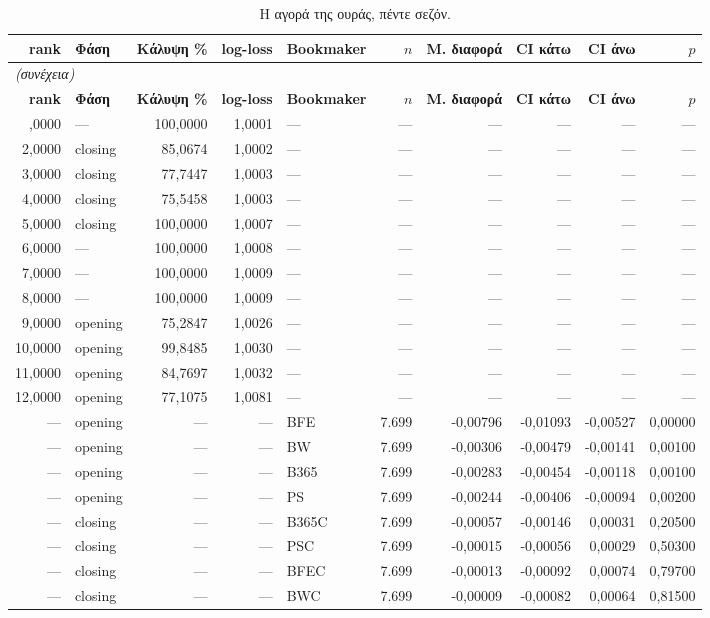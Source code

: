 {\scriptsize
\begin{longtable}{@{}rlrrlrrrrr@{}}
\caption{Η αγορά της ουράς, πέντε σεζόν.}\label{app:rwlive}\\
\toprule \textbf{rank} & \textbf{Φάση} & \textbf{Κάλυψη \%} & \textbf{log-loss} & \textbf{Bookmaker} & \textbf{$n$} & \textbf{Μ. διαφορά} & \textbf{CI κάτω} & \textbf{CI άνω} & \textbf{$p$} \\\midrule\endfirsthead
\multicolumn{10}{l}{\emph{(συνέχεια)}}\\\toprule \textbf{rank} & \textbf{Φάση} & \textbf{Κάλυψη \%} & \textbf{log-loss} & \textbf{Bookmaker} & \textbf{$n$} & \textbf{Μ. διαφορά} & \textbf{CI κάτω} & \textbf{CI άνω} & \textbf{$p$} \\\midrule\endhead
\bottomrule\endfoot
1,0000 & --- & 100,0000 & 1,0001 & --- & --- & --- & --- & --- & --- \\
2,0000 & closing & 85,0674 & 1,0002 & --- & --- & --- & --- & --- & --- \\
3,0000 & closing & 77,7447 & 1,0003 & --- & --- & --- & --- & --- & --- \\
4,0000 & closing & 75,5458 & 1,0003 & --- & --- & --- & --- & --- & --- \\
5,0000 & closing & 100,0000 & 1,0007 & --- & --- & --- & --- & --- & --- \\
6,0000 & --- & 100,0000 & 1,0008 & --- & --- & --- & --- & --- & --- \\
7,0000 & --- & 100,0000 & 1,0009 & --- & --- & --- & --- & --- & --- \\
8,0000 & --- & 100,0000 & 1,0009 & --- & --- & --- & --- & --- & --- \\
9,0000 & opening & 75,2847 & 1,0026 & --- & --- & --- & --- & --- & --- \\
10,0000 & opening & 99,8485 & 1,0030 & --- & --- & --- & --- & --- & --- \\
11,0000 & opening & 84,7697 & 1,0032 & --- & --- & --- & --- & --- & --- \\
12,0000 & opening & 77,1075 & 1,0081 & --- & --- & --- & --- & --- & --- \\
--- & opening & --- & --- & BFE & 7.699 & -0,00796 & -0,01093 & -0,00527 & 0,00000 \\
--- & opening & --- & --- & BW & 7.699 & -0,00306 & -0,00479 & -0,00141 & 0,00100 \\
--- & opening & --- & --- & B365 & 7.699 & -0,00283 & -0,00454 & -0,00118 & 0,00100 \\
--- & opening & --- & --- & PS & 7.699 & -0,00244 & -0,00406 & -0,00094 & 0,00200 \\
--- & closing & --- & --- & B365C & 7.699 & -0,00057 & -0,00146 & 0,00031 & 0,20500 \\
--- & closing & --- & --- & PSC & 7.699 & -0,00015 & -0,00056 & 0,00029 & 0,50300 \\
--- & closing & --- & --- & BFEC & 7.699 & -0,00013 & -0,00092 & 0,00074 & 0,79700 \\
--- & closing & --- & --- & BWC & 7.699 & -0,00009 & -0,00082 & 0,00064 & 0,81500 \\
\end{longtable}
}

